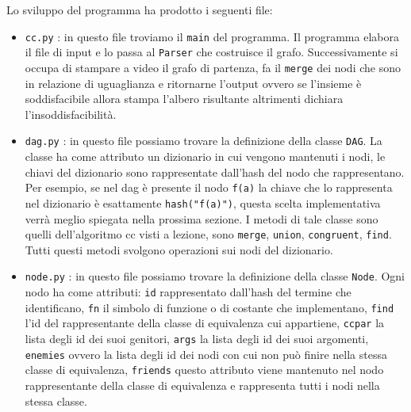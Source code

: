 \documentclass[a4paper, 11pt]{article}
\begin{document}
Lo sviluppo del programma ha prodotto i seguenti file:
\begin{itemize}
\item \verb|cc.py| : in questo file troviamo il \verb|main| del programma. Il programma elabora il file di input e lo passa al \verb|Parser| che costruisce il grafo. Successivamente si occupa di stampare a video il grafo di partenza, fa il \verb|merge| dei nodi che sono in relazione di uguaglianza e ritornarne l'output ovvero se l'insieme è soddisfacibile allora stampa l'albero risultante altrimenti dichiara l'insoddisfacibilità.
\item \verb|dag.py| : in questo file possiamo trovare la definizione della classe \verb|DAG|. La classe ha come attributo un dizionario in cui vengono mantenuti i nodi, le chiavi del dizionario sono rappresentate dall'hash del nodo che rappresentano. Per esempio, se nel dag è presente il nodo \verb|f(a)| la chiave che lo rappresenta nel dizionario è esattamente \verb|hash("f(a)")|, questa scelta implementativa verrà meglio spiegata nella prossima sezione. I metodi di tale classe sono quelli dell'algoritmo cc visti a lezione, sono \verb|merge|, \verb|union|, \verb|congruent|, \verb|find|. Tutti questi metodi svolgono operazioni sui nodi del dizionario. 
\item \verb|node.py| : in questo file possiamo trovare la definizione della classe \verb|Node|. Ogni nodo ha come attributi: \verb|id| rappresentato dall'hash del termine che identificano, \verb|fn| il simbolo di funzione o di costante che implementano, \verb|find| l'id del rappresentante della classe di equivalenza cui appartiene, \verb|ccpar| la lista degli id dei suoi genitori, \verb|args| la lista degli id dei suoi argomenti, \verb|enemies| ovvero la lista degli id dei nodi con cui non può finire nella stessa classe di equivalenza, \verb|friends| questo attributo viene mantenuto nel nodo rappresentante della classe di equivalenza e rappresenta tutti i nodi nella stessa classe.

\end{itemize}
\end{document}
